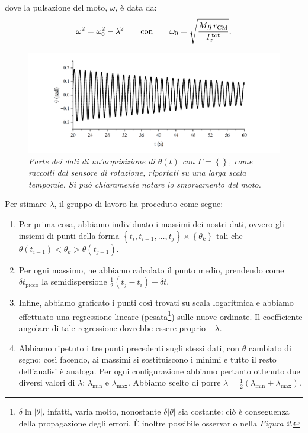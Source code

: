 \documentclass{article}
\begin{document}
dove la pulsazione del moto, $\omega$, è data da:
\[
  \omega^2 = \omega_0^2 - \lambda^2
  \qquad\text{con}\qquad
  \omega_0 = \sqrt{\frac{Mg\,r_\text{CM}}{I_z^\text{\,tot}}}.
\]

\begin{center}
  \begin{figure}[H]
    \includegraphics[trim={2cm .5cm 2cm .5cm},clip,width=\textwidth]{img/Graph1.png}
    \caption[]{\emph{
      Parte dei dati di un'acquisizione di $\theta(t)$
      con $\Gamma=\left\{\right\}$,
      come raccolti dal sensore di rotazione,
      riportati su una larga scala temporale.
      Si può chiaramente notare lo smorzamento
      del moto.
    }}
  \end{figure}
\end{center}

Per stimare $\lambda$, il gruppo di lavoro ha proceduto come segue:
\begin{enumerate}
  \item
    Per prima cosa, abbiamo individuato i massimi dei nostri dati,
    ovvero gli insiemi di punti della forma
    $\left\{t_i,t_{i+1},\dots,t_j\right\}\times\left\{\theta_k\right\}$
    tali che $\theta(t_{i-1}) < \theta_k > \theta(t_{j+1})$.
  \item
    Per ogni massimo, ne abbiamo calcolato il punto medio,
    prendendo come $\delta t_\text{picco}$ la semidispersione $\frac{1}{2}(t_j - t_i) + \delta t$.
  \item
    Infine, abbiamo graficato i punti così trovati
    su scala logaritmica e
    abbiamo effettuato una regressione lineare (pesata\footnote{
      $\delta\!\ln{\left|\theta\right|}$, infatti, varia molto,
      nonostante $\delta\!\left|\theta\right|$ sia costante:
      ciò è conseguenza della propagazione degli errori.
      È inoltre possibile osservarlo nella \emph{Figura 2}.
    })
    sulle nuove ordinate. Il coefficiente angolare di tale
    regressione dovrebbe essere proprio $-\lambda$.
  \item
    Abbiamo ripetuto i tre punti precedenti sugli stessi dati,
    con $\theta$ cambiato di segno: così facendo, ai massimi
    si sostituiscono i minimi e tutto il resto dell'analisi
    è analoga. Per ogni configurazione abbiamo pertanto ottenuto
    due diversi valori di $\lambda$: $\lambda_\text{min}$ e
    $\lambda_\text{max}$. Abbiamo scelto di porre
    $\lambda=\frac{1}{2}(\lambda_\text{min}+\lambda_\text{max})$.
\end{enumerate}
\end{document}
